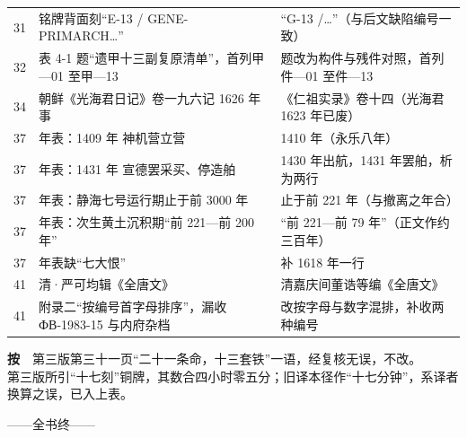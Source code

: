 {\begin{longtable}{@{}p{17mm}p{58mm}p{58mm}@{}}
31 & 铭牌背面刻“E-13 / GENE-PRIMARCH…” & “G-13 /…”（与后文缺陷编号一致）\\
32 & 表 4-1 题“遗甲十三副复原清单”，首列甲—01 至甲—13 & 题改为构件与残件对照，首列件—01 至件—13\\
34 & 朝鲜《光海君日记》卷一九六记 1626 年事 & 《仁祖实录》卷十四（光海君 1623 年已废）\\
37 & 年表：1409 年 神机营立营 & 1410 年（永乐八年）\\
37 & 年表：1431 年 宣德罢采买、停造舶 & 1430 年出航，1431 年罢舶，析为两行\\
37 & 年表：静海七号运行期止于前 3000 年 & 止于前 221 年（与撤离之年合）\\
37 & 年表：次生黄土沉积期“前 221—前 200 年” & “前 221—前 79 年”（正文作约三百年）\\
37 & 年表缺“七大恨” & 补 1618 年一行\\
41 & 清·严可均辑《全唐文》 & 清嘉庆间董诰等编《全唐文》\\
41 & 附录二“按编号首字母排序”，漏收 ФВ-1983-15 与内府杂档 & 改按字母与数字混排，补收两种编号\\
\bottomrule
\end{longtable}
}

\vspace{3mm}
{\footnotesize
\textbf{按}　第三版第三十一页“二十一条命，十三套铁”一语，经复核无误，不改。\\
第三版所引“十七刻”铜牌，其数合四小时零五分；旧译本径作“十七分钟”，系译者换算之误，已入上表。\\
}

\vspace{8mm}
\begin{center}
{\small\color{pencil}
——\quad 全书终\quad ——}
\end{center}
